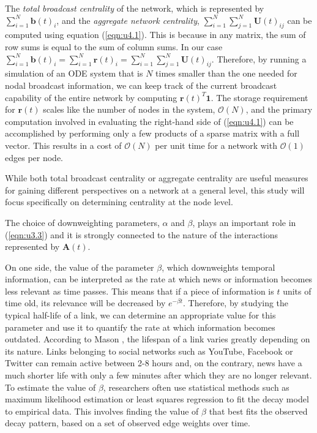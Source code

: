 The \textit{total broadcast centrality} of the network, which is represented by $\sum_{i=1}^{N} \mathbf{b}(t)_i$, and the \textit{aggregate network centrality}, $\sum_{i=1}^{N}\sum_{j=1}^{N} \mathbf{U}(t)_{ij}$ can be computed using equation (\ref{eqn:u4.1}). This is because in any matrix, the sum of row sums is equal to the sum of column sums. In our case $\sum_{i=1}^{N} \mathbf{b}(t)_i = \sum_{i=1}^{N} \mathbf{r}(t)_i=\sum_{i=1}^{N}\sum_{j=1}^{N} \mathbf{U}(t)_{ij}$. Therefore, by running a simulation of an ODE system that is $N$ times smaller than the one needed for nodal broadcast information, we can keep track of the current broadcast capability of the entire network by computing $\mathbf{r}(t)^T\mathbf{1}$. The storage requirement for $\mathbf{r}(t)$ scales like the number of nodes in the system, $\mathcal{O}(N)$, and the primary computation involved in evaluating the right-hand side of (\ref{eqn:u4.1}) can be accomplished by performing only a few products of a sparse matrix with a full vector. This results in a cost of $\mathcal{O}(N)$ per unit time for a network with $\mathcal{O}(1)$ edges per node.

While both total broadcast centrality or aggregate centrality are useful measures for gaining different perspectives on a network at a general level, this study will focus specifically on determining centrality at the node level.

\begin{highlightedParagraphC}
 
The choice of downweighting parameters, $\alpha$ and $\beta$, plays an important role in (\ref{eqn:u3.3}) and it is strongly connected to the nature of the interactions represented by $\mathbf{A}(t)$.

\end{highlightedParagraphC}

On one side, the value of the parameter $\beta$, which downweights temporal information, can be interpreted as the rate at which news or information becomes less relevant as time passes. This means that if a piece of information is $t$ units of time old, its relevance will be decreased by $e^{−\beta t}$. Therefore, by studying the typical half-life of a link, we can determine an appropriate value for this parameter and use it to quantify the rate at which information becomes outdated. According to Mason \cite{lifespan}, the lifespan of a link varies greatly depending on its nature. Links belonging to social networks such as YouTube, Facebook or Twitter can remain active between 2-8 hours and, on the contrary, news have a much shorter life with only a few minutes after which they are no longer relevant. To estimate the value of $\beta$, researchers often use statistical methods such as maximum likelihood estimation or least squares regression to fit the decay model to empirical data. This involves finding the value of $\beta$ that best fits the observed decay pattern, based on a set of observed edge weights over time.

